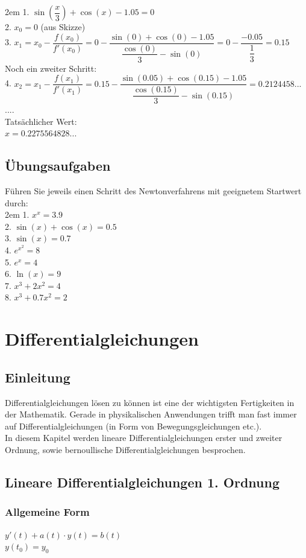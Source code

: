 \documentclass[11pt,final]{scrreprt}
\newcommand{\br} {\medskip\\}
\begin{document}
\begingroup
\leftskip2em 
1. $ \sin\left( \dfrac{x}{3}\right) + \cos(x) -1.05 = 0 $\br
2. $x_0 = 0 $ (aus Skizze)\br
3. $ x_1 =x_0 - \dfrac{f(x_0)}{f'(x_0)}= 0 - \dfrac{\sin(0)+\cos(0)-1.05}{\dfrac{\cos(0)}{3}-\sin(0)} = 0-\dfrac{-0.05}{\dfrac{1}{3}} = 0.15$\br
Noch ein zweiter Schritt: \br
4. $ x_2 =x_1 - \dfrac{f(x_1)}{f'(x_1)}= 0.15 - \dfrac{\sin(0.05)+\cos(0.15)-1.05}{\dfrac{\cos(0.15)}{3}-\sin(0.15)} = 0.2124458...$\br
....\br
Tatsächlicher Wert:\br
$x=0.2275564828...$\br
\par	
\endgroup 

\section{Übungsaufgaben}

Führen Sie jeweils einen Schritt des Newtonverfahrens mit geeignetem Startwert durch:\\

\begingroup
\leftskip2em 
1. $ x^x = 3.9 $\br
2. $ \sin(x)+\cos(x) = 0.5$\br
3. $ \sin(x) = 0.7$\br
4. $ e^{x^2} = 8$\br
5. $ e^x = 4$\br
6. $ \ln(x)=9$\br
7. $ x^3+2x^2=4$\br
8. $ x^3+0.7x^2 = 2$\br
\par	
\endgroup 

\chapter{Differentialgleichungen}

\section{Einleitung}
Differentialgleichungen lösen zu können ist eine der wichtigsten Fertigkeiten in der Mathematik. Gerade in physikalischen Anwendungen trifft man fast immer auf Differentialgleichungen (in Form von Bewegungsgleichungen etc.).\\
In diesem Kapitel werden lineare Differentialgleichungen erster und zweiter Ordnung, sowie bernoullische Differentialgleichungen besprochen.\\

\section{Lineare Differentialgleichungen 1. Ordnung}

\subsection*{Allgemeine Form}
$ y'(t)+a(t)\cdot y(t) = b(t) $\\
$ y(t_0) = y_0 $\\
\end{document}
